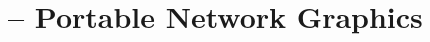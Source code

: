 \begin{comment}
  
\end{comment}

\chapter{\png -- Portable Network Graphics}
\label{cha:png}

\begin{refsection}

  \printbibliography[heading=subbibliography]

\end{refsection}